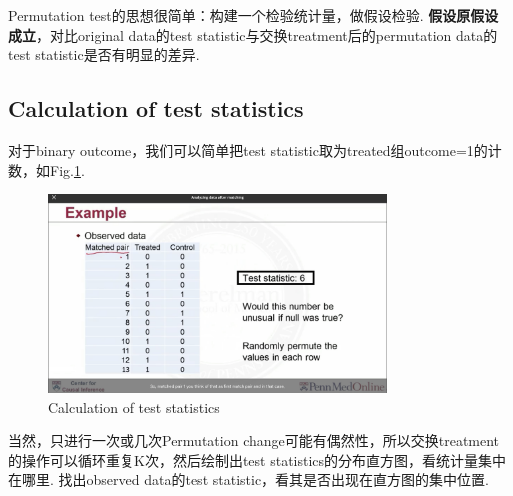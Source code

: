 Permutation test的思想很简单：构建一个检验统计量，做假设检验. {\bfseries 假设原假设成立}，对比original data的test statistic与交换treatment后的permutation data的test statistic是否有明显的差异.
\subsection{Calculation of test statistics}
对于binary outcome，我们可以简单把test statistic取为treated组outcome=1的计数，如Fig.\ref{exper}.
\begin{figure}
	\setlength{\abovecaptionskip}{0pt}     %
	\setlength{\belowcaptionskip}{10pt}
	\vspace{-0cm}  %
	\setlength{\abovecaptionskip}{-0cm}   %
	\setlength{\belowcaptionskip}{-0cm}   %
	\centering
	\includegraphics[width=0.8\textwidth]{figure/exper.jpg}
	\caption{Calculation of test statistics}
	\label{exper}
\end{figure}

当然，只进行一次或几次Permutation change可能有偶然性，所以交换treatment的操作可以循环重复K次，然后绘制出test statistics的分布直方图，看统计量集中在哪里. 找出observed data的test statistic，看其是否出现在直方图的集中位置. 

